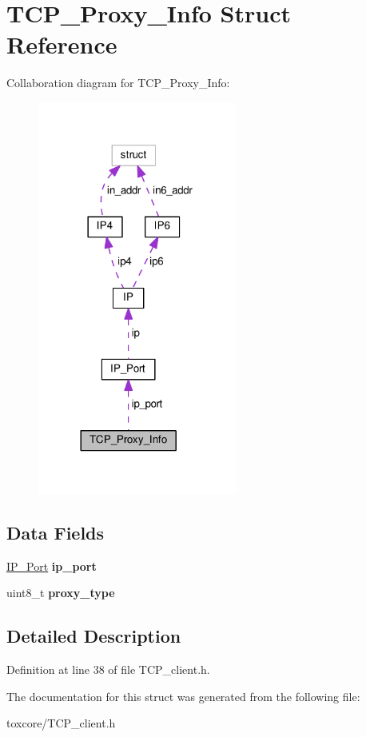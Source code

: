 \hypertarget{struct_t_c_p___proxy___info}{\section{T\+C\+P\+\_\+\+Proxy\+\_\+\+Info Struct Reference}
\label{struct_t_c_p___proxy___info}
}


Collaboration diagram for T\+C\+P\+\_\+\+Proxy\+\_\+\+Info\+:
\nopagebreak
\begin{figure}[H]
\begin{center}
\leavevmode
\includegraphics[width=185pt]{struct_t_c_p___proxy___info__coll__graph}
\end{center}
\end{figure}
\subsection*{Data Fields}
\begin{DoxyCompactItemize}
\item 
\hypertarget{struct_t_c_p___proxy___info_a86e2a5a56c0dd22df6e8b8a10e40f9e4}{\hyperlink{struct_i_p___port}{I\+P\+\_\+\+Port} {\bfseries ip\+\_\+port}}\label{struct_t_c_p___proxy___info_a86e2a5a56c0dd22df6e8b8a10e40f9e4}

\item 
\hypertarget{struct_t_c_p___proxy___info_a23a098bd0536ae2000e1944e353b7d8b}{uint8\+\_\+t {\bfseries proxy\+\_\+type}}\label{struct_t_c_p___proxy___info_a23a098bd0536ae2000e1944e353b7d8b}

\end{DoxyCompactItemize}


\subsection{Detailed Description}


Definition at line 38 of file T\+C\+P\+\_\+client.\+h.



The documentation for this struct was generated from the following file\+:\begin{DoxyCompactItemize}
\item 
toxcore/T\+C\+P\+\_\+client.\+h\end{DoxyCompactItemize}
